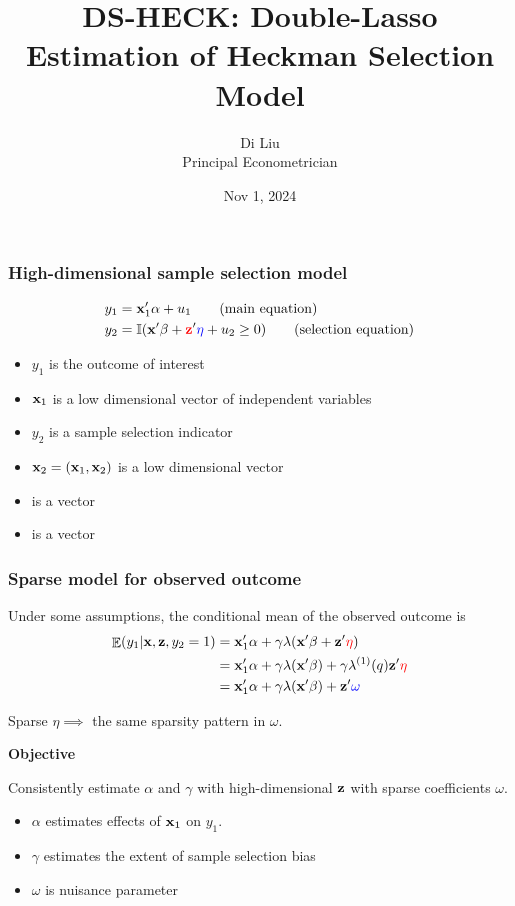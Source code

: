 \documentclass[11pt]{beamer}
\title{DS-HECK: Double-Lasso Estimation of Heckman Selection Model}
\author{Di Liu \\ {\tiny Principal Econometrician} }
\institute{\large Stata}
\date{Nov 1, 2024}
\begin{document}
\maketitle

\begin{frame}
  \frametitle{High-dimensional sample selection model}
\begin{align}
  y_{1} &= \mathbf{x}_{1}'\mathbf{\alpha} + u_{1}  \tag{main equation}\\
  y_{2} &=\mathbb{I}(\mathbf{x}'\mathbf{\beta}+  {\color{red}{\mathbf{z}}}' {\color{blue}{\mathbf{\eta}}} + u_{2} \geq 0) \tag{selection
equation}
\end{align}

\begin{itemize}
  \item $y_1$ is the outcome of interest
  \item $\mathbf{x}_1$ is a low dimensional vector of independent variables 
 \item $y_2$ is a sample selection indicator
  \item $\mathbf{x}_2 = (\mathbf{x}_1, \mathbf{x}_2)$ is a low dimensional vector
  \item \myred{$\zvar$} is a  vector
  \item \myblue{$\eta$} is a  vector
\end{itemize}

\end{frame}

\begin{frame}
  \frametitle{Sparse model for observed outcome}
Under some assumptions, the conditional mean of the observed outcome is
\begin{align*}
\mathop{\mathbb{E}}(y_{1} | \mathbf{x}, \mathbf{z}, y_2 = 1) 
&= \mathbf{x}_1'\mathbf{\alpha} + \gamma \lambda(\mathbf{x}'\mathbf{\beta} + \mathbf{z}'{\color{red}{\eta}}) \\
&= \mathbf{x}_1'\mathbf{\alpha} + \gamma \lambda(\mathbf{x}'\mathbf{\beta}) 
+\gamma \lambda^{(1)}(q) \mathbf{z}'{\color{red}{\eta}} \\
	&= \mathbf{x}_1'\mathbf{\alpha} + \gamma \lambda(\mathbf{x}'\mathbf{\beta}) 
	+ \mathbf{z}'{\color{blue}{\omega}}
\end{align*}

Sparse $\eta \implies $ the same sparsity pattern in $\omega$.

\vskip 0.5cm
{\bf Objective}

Consistently estimate $\alpha$ and $\gamma$ with high-dimensional $\zvar$ with
sparse coefficients $\omega$.
\begin{itemize}
  \item $\alpha$ estimates effects of $\mathbf{x}_1$ on $y_1$.
  \item $\gamma$ estimates the extent of sample selection bias
  \item $\omega$ is nuisance parameter
\end{itemize}
\end{frame}
\end{document}
